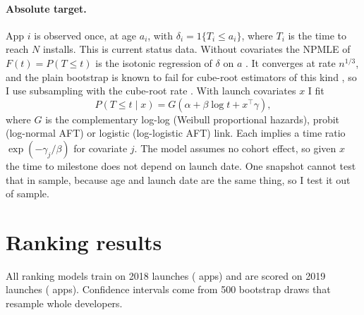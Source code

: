 \documentclass[11pt]{article}
\begin{document}
\paragraph{Absolute target.} App $i$ is observed once, at age $a_i$, with $\delta_i = 1\{T_i \le a_i\}$, where
$T_i$ is the time to reach $N$ installs. This is current status data. Without covariates the NPMLE of
$F(t) = P(T \le t)$ is the isotonic regression of $\delta$ on $a$ \citep{groeneboom1992}. It converges at rate
$n^{1/3}$, and the plain bootstrap is known to fail for cube-root estimators of this kind \citep{sen2010}, so I
use subsampling with the cube-root rate \citep{politis1994}. With launch covariates $x$ I fit
\begin{equation}
P(T \le t \mid x) = G(\alpha + \beta \log t + x^\top\gamma),
\end{equation}
where $G$ is the complementary log-log (Weibull proportional hazards), probit (log-normal AFT) or logistic
(log-logistic AFT) link. Each implies a time ratio $\exp(-\gamma_j/\beta)$ for covariate $j$. The model assumes no
cohort effect, so given $x$ the time to milestone does not depend on launch date. One snapshot cannot test that in
sample, because age and launch date are the same thing, so I test it out of sample.

\section{Ranking results}

All ranking models train on 2018 launches (\TrainApps{} apps) and are scored on 2019 launches (\TestApps{} apps).
Confidence intervals come from 500 bootstrap draws that resample whole developers.
\end{document}
